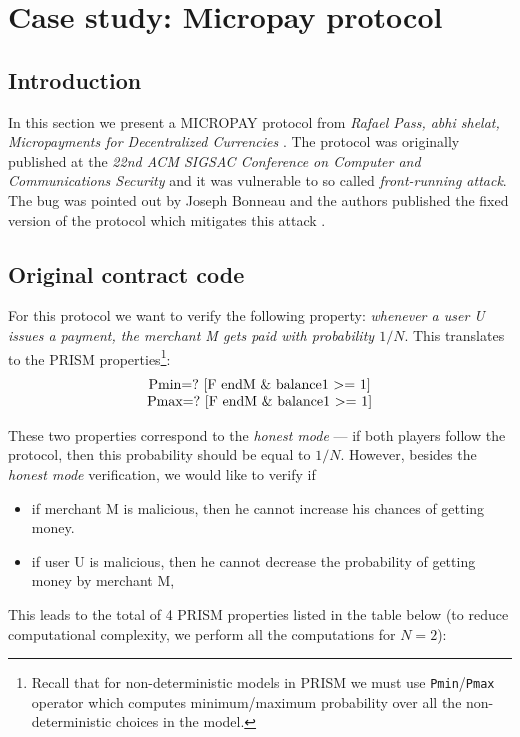 
\section{Case study: Micropay protocol}

\subsection{Introduction}

In this section we present a MICROPAY protocol from \emph{Rafael Pass, abhi shelat, 
Micropayments for Decentralized Currencies} \cite{CCS:PasShe15}.
The protocol was originally published at the \emph{22nd ACM SIGSAC Conference on Computer and 
Communications Security} and it was vulnerable to so called \emph{front-running attack}.
The bug was pointed out by Joseph Bonneau and the authors published the fixed version of the protocol
which mitigates this attack \cite{EPRINT:Passhe16}.

\subsection{Original contract code}



For this protocol we want to verify the following property: \emph{whenever a user U issues a payment, 
the merchant M gets paid with probability $1/N$}.
This translates to the PRISM properties\footnote{Recall that for non-deterministic models in PRISM we must use 
\lstinline{Pmin}/\lstinline{Pmax} operator which computes minimum/maximum probability over all the non-deterministic
choices in the model.}:
\[
\begin{tabular}{c}
\lstinline{Pmin=? [F endM & balance1 >= 1]} \\
\lstinline{Pmax=? [F endM & balance1 >= 1]}
\end{tabular}
\]

These two properties correspond to the \emph{honest mode} --- if both players follow the protocol, then this probability
should be equal to $1/N$.
However, besides the \emph{honest mode} verification, we would like to verify if
\begin{itemize}
\item if merchant M is malicious, then he cannot increase his chances of getting money.
\item if user U is malicious, then he cannot decrease the probability of getting money by merchant M,
\end{itemize}
This leads to the total of 4 PRISM properties listed in the table below
(to reduce computational complexity, we perform all the computations for $N = 2$):

